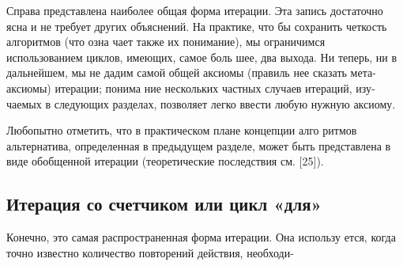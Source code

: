 \noindent Справа представлена наиболее общая форма 
итерации. Эта запись достаточно ясна и не 
требует других объяснений.  На практике, что­
бы сохранить четкость алгоритмов (что озна­
чает также их понимание), мы ограничимся              
использованием  циклов,  имеющих,  самое  боль­
шее,  два  выхода.  Ни  теперь,  ни  в  дальнейшем, 
мы  не  дадим  самой  общей  аксиомы  (правиль­
нее  сказать  мета-аксиомы)  итерации;  понима­
ние нескольких частных случаев итераций, изу­
чаемых в следующих разделах,  позволяет легко 
ввести  любую  нужную  аксиому.

\parindent=1cm Любопытно отметить,  что  в  практическом  плане  концепции  алго­
ритмов альтернатива, определенная в предыдущем разделе, может быть 
представлена в виде обобщенной итерации  (теоретические  последствия 
см.  [25]).
\subsection{Итерация со счетчиком или цикл «для»}
\noindent Конечно,  это  самая  распространенная  форма  итерации.  Она использу­
ется, когда точно известно количество повторений действия, необходи-
\pagebreak

